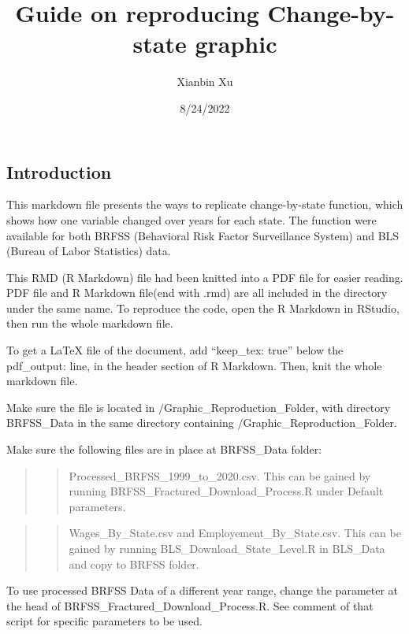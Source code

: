 \documentclass[
]{article}
\title{Guide on reproducing Change-by-state graphic}
\author{Xianbin Xu}
\date{8/24/2022}
\begin{document}
\maketitle

\hypertarget{introduction}{%
\subsection{Introduction}\label{introduction}}

This markdown file presents the ways to replicate change-by-state
function, which shows how one variable changed over years for each
state. The function were available for both BRFSS (Behavioral Risk
Factor Surveillance System) and BLS (Bureau of Labor Statistics) data.

This RMD (R Markdown) file had been knitted into a PDF file for easier
reading. PDF file and R Markdown file(end with .rmd) are all included in
the directory under the same name. To reproduce the code, open the R
Markdown in RStudio, then run the whole markdown file.

To get a LaTeX file of the document, add ``keep\_tex: true'' below the
pdf\_output: line, in the header section of R Markdown. Then, knit the
whole markdown file.

Make sure the file is located in \(/\)Graphic\_Reproduction\_Folder,
with directory BRFSS\_Data in the same directory containing
\(/\)Graphic\_Reproduction\_Folder.

Make sure the following files are in place at BRFSS\_Data folder:

\begin{quote}
\begin{quote}
Processed\_BRFSS\_1999\_to\_2020.csv. This can be gained by running
BRFSS\_Fractured\_Download\_Process.R under Default parameters.
\end{quote}
\end{quote}

\begin{quote}
\begin{quote}
Wages\_By\_State.csv and Employement\_By\_State.csv. This can be gained
by running BLS\_Download\_State\_Level.R in BLS\_Data and copy to BRFSS
folder.
\end{quote}
\end{quote}

To use processed BRFSS Data of a different year range, change the
parameter at the head of BRFSS\_Fractured\_Download\_Process.R. See
comment of that script for specific parameters to be used.
\end{document}
